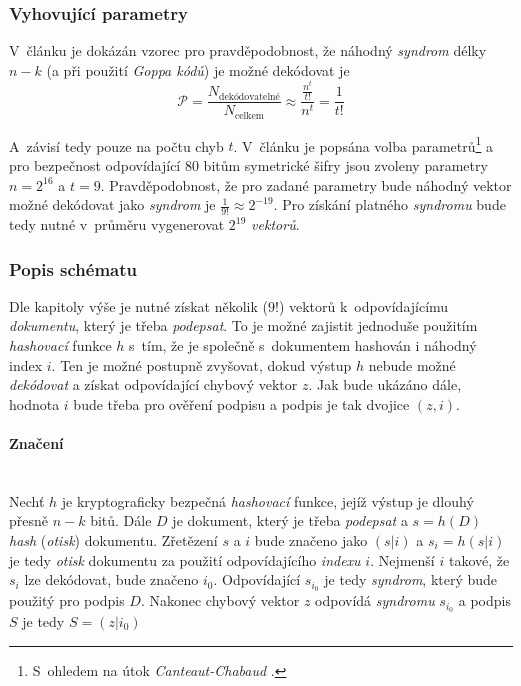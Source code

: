 \documentclass[thesis=M,czech,hidelinks]{FITthesis}[2012/06/26]
\newcommand{\0}{{\textcolor[gray]{0.80}{0}}}
\begin{document}
\subsubsection{Vyhovující parametry}
V~článku je dokázán vzorec pro pravděpodobnost, že náhodný \emph{syndrom} délky
$n-k$ (a při použití \emph{Goppa kódů}) je možné dekódovat je
$$
    \mathcal{P} = \frac{N_{\text{dekódovatelné}}}{N_{\text{celkem}}} \approx
    \frac{\frac{n^t}{t!}}{n^t} = \frac{1}{t!}
$$


A~závisí tedy pouze na počtu chyb $t$. V~článku je popsána volba
parametrů\footnote{
    S~ohledem na útok \emph{Canteaut-Chabaud} \cite{Canteaut}.
} a pro bezpečnost odpovídající $80$ bitům symetrické šifry jsou zvoleny
parametry $n=2^{16}$ a $t=9$.  Pravděpodobnost, že pro zadané parametry bude
náhodný vektor možné dekódovat jako \emph{syndrom} je $\frac{1}{9!} \approx
2^{-19}$. Pro získání platného \emph{syndromu} bude tedy nutné v~průměru
vygenerovat $2^{19}$ \emph{vektorů}.

\subsubsection{Popis schématu}
Dle kapitoly výše je nutné získat několik ($9!$) vektorů k~odpovídajícímu
\emph{dokumentu}, který je třeba \emph{podepsat}. To je možné zajistit jednoduše
použitím \emph{hashovací} funkce $h$ s~tím, že je
společně s~dokumentem hashován i náhodný index $i$. Ten je možné postupně
zvyšovat, dokud výstup $h$ nebude možné \emph{dekódovat} a získat odpovídající
chybový vektor $z$. Jak bude ukázáno dále, hodnota $i$ bude třeba pro ověření
podpisu a podpis je tak dvojice $(z,i)$.

\paragraph{Značení} \hfil \\
Nechť $h$ je kryptograficky bezpečná \emph{hashovací} funkce, jejíž výstup je
dlouhý přesně $n-k$ bitů. Dále $D$ je dokument, který je třeba \emph{podepsat}
a $ s = h\left(D\right)$ \emph{hash} (\emph{otisk}) dokumentu. Zřetězení $s$ a
$i$ bude značeno jako $(s|i)$ a $s_i = h(s|i)$ je tedy \emph{otisk} dokumentu za
použití odpovídajícího \emph{indexu} $i$.
Nejmenší $i$ takové, že $s_i$ lze dekódovat, bude značeno $i_0$. Odpovídající
$s_{i_0}$ je tedy \emph{syndrom}, který bude použitý pro podpis $D$. Nakonec
chybový vektor $z$ odpovídá \emph{syndromu} $s_{i_0}$ a podpis $S$ je tedy
$S = ( z | i_0 )$
\end{document}
